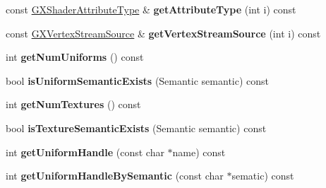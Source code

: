 \begin{DoxyCompactItemize}
\item 
const \hyperlink{class_magnum_1_1_g_x_shader_attribute_type}{G\+X\+Shader\+Attribute\+Type} \& {\bfseries get\+Attribute\+Type} (int i) const \hypertarget{class_magnum_1_1_visual_effect_1_1_data_afe039adcf4fad48ef697c5209e9e65c2}{}\label{class_magnum_1_1_visual_effect_1_1_data_afe039adcf4fad48ef697c5209e9e65c2}

\item 
const \hyperlink{class_magnum_1_1_g_x_vertex_stream_source}{G\+X\+Vertex\+Stream\+Source} \& {\bfseries get\+Vertex\+Stream\+Source} (int i) const \hypertarget{class_magnum_1_1_visual_effect_1_1_data_a960fe160589f815422f7f3201677df58}{}\label{class_magnum_1_1_visual_effect_1_1_data_a960fe160589f815422f7f3201677df58}

\item 
int {\bfseries get\+Num\+Uniforms} () const \hypertarget{class_magnum_1_1_visual_effect_1_1_data_a3e261312b07d88e2729674a3c0ac80e2}{}\label{class_magnum_1_1_visual_effect_1_1_data_a3e261312b07d88e2729674a3c0ac80e2}

\item 
bool {\bfseries is\+Uniform\+Semantic\+Exists} (Semantic semantic) const \hypertarget{class_magnum_1_1_visual_effect_1_1_data_ab0257da461348784299f565841ab3059}{}\label{class_magnum_1_1_visual_effect_1_1_data_ab0257da461348784299f565841ab3059}

\item 
int {\bfseries get\+Num\+Textures} () const \hypertarget{class_magnum_1_1_visual_effect_1_1_data_a4139d8d66db7c2b4694a2868d43a8301}{}\label{class_magnum_1_1_visual_effect_1_1_data_a4139d8d66db7c2b4694a2868d43a8301}

\item 
bool {\bfseries is\+Texture\+Semantic\+Exists} (Semantic semantic) const \hypertarget{class_magnum_1_1_visual_effect_1_1_data_a302003db04b17a41eab91107f623f58f}{}\label{class_magnum_1_1_visual_effect_1_1_data_a302003db04b17a41eab91107f623f58f}

\item 
int {\bfseries get\+Uniform\+Handle} (const char $\ast$name) const \hypertarget{class_magnum_1_1_visual_effect_1_1_data_ab24a1afbac359b73cd9e527cf6c1f396}{}\label{class_magnum_1_1_visual_effect_1_1_data_ab24a1afbac359b73cd9e527cf6c1f396}

\item 
int {\bfseries get\+Uniform\+Handle\+By\+Semantic} (const char $\ast$sematic) const \hypertarget{class_magnum_1_1_visual_effect_1_1_data_ada0b3e11a71d92f1dfa4547b75efa267}{}\label{class_magnum_1_1_visual_effect_1_1_data_ada0b3e11a71d92f1dfa4547b75efa267}


\end{DoxyCompactItemize}
